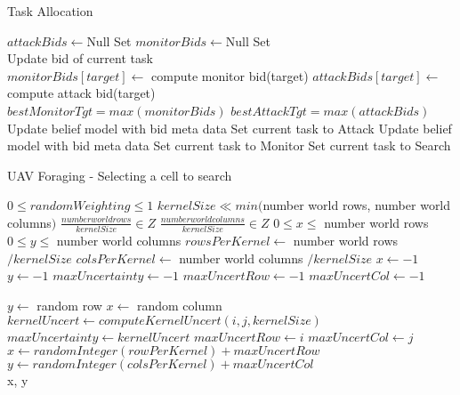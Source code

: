 \begin{algorithm}[H]
	\caption{Task Allocation}
	\label{alg:taskAlloc}
	\begin{algorithmic}[1]
		\State $attackBids \gets $Null Set
		\State $monitorBids \gets $Null Set
		\\
			\State Update bid of current task
		\EndIf
		\\
			\State $monitorBids[target] \gets$ compute monitor bid(target)
				\State $attackBids[target] \gets$ compute attack bid(target)
			\EndIf
		\EndFor
		\\
		\State $bestMonitorTgt = max(monitorBids)$
		\State $bestAttackTgt = max(attackBids)$
		\\
			\State Update belief model with bid meta data
			\State Set current task to Attack
			\State Update belief model with bid meta data		
			\State Set current task to Monitor			
		\Else
			\State Set current task to Search
		\EndIf
		
	\end{algorithmic}
\end{algorithm}

\begin{algorithm}[H]
	\caption{UAV Foraging - Selecting a cell to search}
	\label{alg:forage}
	\begin{algorithmic}[1]
		\Require $ 0\le randomWeighting \le 1$
		\Require $ kernelSize \ll min($number world rows, number world columns$)$
		\Require $ \frac{number world rows}{kernelSize} \in Z$
		\Require $ \frac{number world columns}{kernelSize} \in Z$
		\Ensure $ 0 \le x \le $ number world rows
		\Ensure $ 0 \le y \le $ number world columns
		\State $rowsPerKernel\gets $ number world rows $ / kernelSize$
		\State $colsPerKernel\gets $ number world columns $ / kernelSize$		
		\State $x\gets -1$
		\State $y\gets -1$
		\State $maxUncertainty\gets -1$
		\State $maxUncertRow\gets -1$
		\State $maxUncertCol\gets -1$
		
		
		\State $ y\gets $ random row
		\State $ x\gets $ random column
		\Else
		\State $kernelUncert\gets computeKernelUncert(i,j, kernelSize)$
		\State $maxUncertainty\gets kernelUncert$
		\State $maxUncertRow\gets i$
		\State $maxUncertCol\gets j$	
		\EndIf
		\EndFor
		\EndFor
		\State $x\gets randomInteger(rowPerKernel) + maxUncertRow$			
		\State $y\gets randomInteger(colsPerKernel) + maxUncertCol$
		\EndIf \\
		
		\Return x, y
		\EndFunction
	\end{algorithmic}
\end{algorithm}




